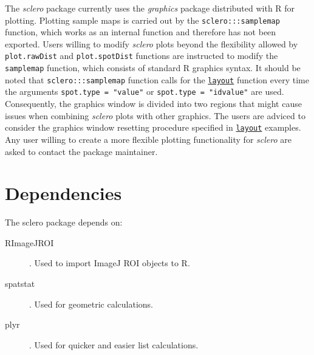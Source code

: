 \documentclass[11pt, a4paper]{article}
\newcommand{\sclero}{\textit{sclero}\xspace}
\begin{document}
The \sclero package currently uses the \textit{graphics} package distributed with R for plotting. Plotting sample maps is carried out by the \texttt{sclero:::samplemap} function, which works as an internal function and therefore has not been exported. Users willing to modify \sclero plots beyond the flexibility allowed by \texttt{plot.rawDist} and \texttt{plot.spotDist} functions are instructed to modify the \texttt{samplemap} function, which consists of standard R graphics syntax. It should be noted that \texttt{sclero:::samplemap} function calls for the \href{https://stat.ethz.ch/R-manual/R-devel/library/graphics/html/layout.html}{\texttt{layout}} function every time the arguments \texttt{spot.type = "value"} or \texttt{spot.type = "idvalue"} are used. Consequently, the graphics window is divided into two regions that might cause issues when combining \sclero plots with other graphics. The users are adviced to consider the graphics window resetting procedure specified in \href{https://stat.ethz.ch/R-manual/R-devel/library/graphics/html/layout.html}{\texttt{layout}} examples. Any user willing to create a more flexible plotting functionality for \sclero are asked to contact the package maintainer.

\section{Dependencies}

The sclero package depends on:

\begin{description}
\item[RImageJROI] \citep{RImageJROI}. Used to import ImageJ ROI objects to R.
\item[spatstat] \citep{Baddeley2005}. Used for geometric calculations.
\item[plyr] \citep{Wickham2011}. Used for quicker and easier list calculations. 
\end{description}



\end{document}
